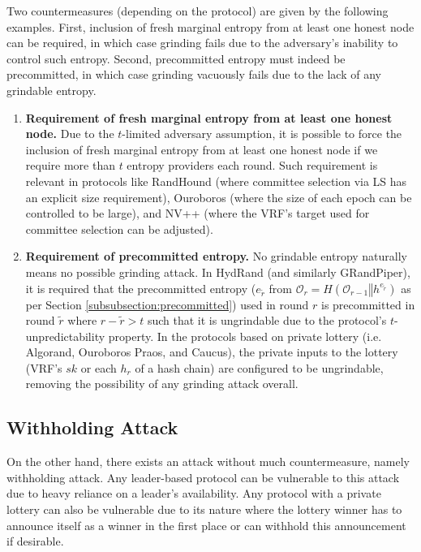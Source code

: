 \documentclass[letterpaper,twocolumn,10pt]{article}
\theoremstyle{definition}
\theoremstyle{remark}
\begin{document}
Two countermeasures (depending on the protocol) are given by the following examples. First, inclusion of fresh marginal entropy from at least one honest node can be required, in which case grinding fails due to the adversary's inability to control such entropy. Second, precommitted entropy must indeed be precommitted, in which case grinding vacuously fails due to the lack of any grindable entropy.
\begin{enumerate}
\item \textbf{Requirement of fresh marginal entropy from at least one honest node.} Due to the $t$-limited adversary assumption, it is possible to force the inclusion of fresh marginal entropy from at least one honest node if we require more than $t$ entropy providers each round. Such requirement is relevant in protocols like RandHound (where committee selection via LS has an explicit size requirement), Ouroboros (where the size of each epoch can be controlled to be large), and NV++ (where the VRF's target used for committee selection can be adjusted).
\item \textbf{Requirement of precommitted entropy.} No grindable entropy naturally means no possible grinding attack. In HydRand (and similarly GRandPiper), it is required that the precommitted entropy ($e_{\tilde{r}}$ from $\mathcal{O}_r = H(\mathcal{O}_{r - 1} \mathbin\Vert h^{e_{\tilde{r}}})$ as per Section \ref{subsubsection:precommitted}) used in round $r$ is precommitted in round $\tilde{r}$ where $r - \tilde{r} > t$ such that it is ungrindable due to the protocol's $t$-unpredictability property. In the protocols based on private lottery (i.e. Algorand, Ouroboros Praos, and Caucus), the private inputs to the lottery (VRF's $sk$ or each $h_r$ of a hash chain) are configured to be ungrindable, removing the possibility of any grinding attack overall.
\end{enumerate}

\subsection{Withholding Attack}
On the other hand, there exists an attack without much countermeasure, namely withholding attack. Any leader-based protocol can be vulnerable to this attack due to heavy reliance on a leader's availability. Any protocol with a private lottery can also be vulnerable due to its nature where the lottery winner has to announce itself as a winner in the first place or can withhold this announcement if desirable.\\
\end{document}

